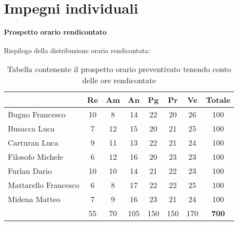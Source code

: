 \section{Impegni individuali} \label{section:impegni_individuali}

\paragraph{Prospetto orario rendicontato}
Riepilogo della distribuzione oraria rendicontata:

\begin{table}[H]
  \centering
  \renewcommand{\arraystretch}{1.8}
  \begin{tabular}{l|cccccc|c}
    \rowcolor[HTML]{125E28} 
    \multicolumn{1}{c}{\color[HTML]{FFFFFF}\textbf{Nome}} 
    & \color[HTML]{FFFFFF}\textbf{Re} 
    & \color[HTML]{FFFFFF}\textbf{Am} 
    & \color[HTML]{FFFFFF}\textbf{An} 
    & \color[HTML]{FFFFFF}\textbf{Pg} 
    & \color[HTML]{FFFFFF}\textbf{Pr} 
    & \color[HTML]{FFFFFF}\textbf{Ve} 
    & \color[HTML]{FFFFFF}\textbf{Totale} \\
    \hline
    Bugno Francesco         & 10  & 8   & 14  & 22  & 20  & 26  & 100 \\
    Busacca Luca            & 7   & 12  & 15  & 20  & 21  & 25  & 100 \\
    Carturan Luca           & 9   & 11  & 13  & 22  & 21  & 24  & 100 \\
    Filosofo Michele        & 6   & 12  & 16  & 20  & 23  & 23  & 100 \\
    Furlan Dario 						& 10	& 10	& 14  & 21 	& 22	& 23 	& 100 \\
    Mattarello Francesco    & 6   & 8   & 17  & 22  & 22  & 25  & 100 \\
    Midena Matteo           & 7   & 9   & 16  & 23  & 21  & 24  & 100 \\
    \hline
    \rowcolor[HTML]{125E28}
    \multicolumn{1}{c}{\color[HTML]{FFFFFF}\textbf{Totale}} 
    & \color[HTML]{FFFFFF}55 
    & \color[HTML]{FFFFFF}70 
    & \color[HTML]{FFFFFF}105 
    & \color[HTML]{FFFFFF}150  
    & \color[HTML]{FFFFFF}150 
    & \color[HTML]{FFFFFF}170 
    & \color[HTML]{FFFFFF}\textbf{700}              
  \end{tabular}
  \caption{Tabella contenente il prospetto orario preventivato tenendo conto delle ore rendicontate}
\end{table}
